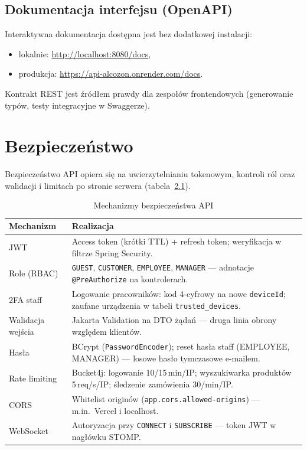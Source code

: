 \documentclass[12pt,a4paper]{report}
\newcommand{\blok}[1]{\needspace{9\baselineskip}#1}
\newcommand{\tabela}[1]{\needspace{11\baselineskip}#1}
\newenvironment{calosc}{%
  \Needspace{14\baselineskip}%
  \begin{samepage}%
}{%
  \end{samepage}%
}
\begin{document}
\begin{calosc}
\section{Dokumentacja interfejsu (OpenAPI)}

Interaktywna dokumentacja dostępna jest bez dodatkowej instalacji:
\begin{itemize}[noitemsep]
  \item lokalnie: \url{http://localhost:8080/docs},
  \item produkcja: \url{https://api-alcozon.onrender.com/docs}.
\end{itemize}
Kontrakt REST jest źródłem prawdy dla zespołów frontendowych (generowanie typów, testy integracyjne w Swaggerze).
\end{calosc}

\chapter{Bezpieczeństwo}

\blok{%
Bezpieczeństwo API opiera się na uwierzytelnianiu tokenowym, kontroli ról oraz walidacji i limitach po stronie serwera (tabela~\ref{tab:security}).
}

\tabela{%
\begin{table}[H]
  \centering
  \caption{Mechanizmy bezpieczeństwa API}
  \label{tab:security}
  \begin{tabularx}{\textwidth}{@{}lX@{}}
    \toprule
    \textbf{Mechanizm} & \textbf{Realizacja} \\
    \midrule
    JWT & Access token (krótki TTL) + refresh token; weryfikacja w filtrze Spring Security. \\
    Role (RBAC) & \texttt{GUEST}, \texttt{CUSTOMER}, \texttt{EMPLOYEE}, \texttt{MANAGER} --- adnotacje \texttt{@PreAuthorize} na kontrolerach. \\
    2FA staff & Logowanie pracowników: kod 4-cyfrowy na nowe \texttt{deviceId}; zaufane urządzenia w tabeli \texttt{trusted\_devices}. \\
    Walidacja wejścia & Jakarta Validation na DTO żądań --- druga linia obrony względem klientów. \\
    Hasła & BCrypt (\texttt{PasswordEncoder}); reset hasła staff (EMPLOYEE, MANAGER) --- losowe hasło tymczasowe e-mailem. \\
    Rate limiting & Bucket4j: logowanie 10/15\,min/IP; wyszukiwarka produktów 5\,req/s/IP; śledzenie zamówienia 30/min/IP. \\
    CORS & Whitelist originów (\texttt{app.cors.allowed-origins}) --- m.in.\ Vercel i localhost. \\
    WebSocket & Autoryzacja przy \texttt{CONNECT} i \texttt{SUBSCRIBE} --- token JWT w nagłówku STOMP. \\
    \bottomrule
  \end{tabularx}
\end{table}
}
\end{document}

